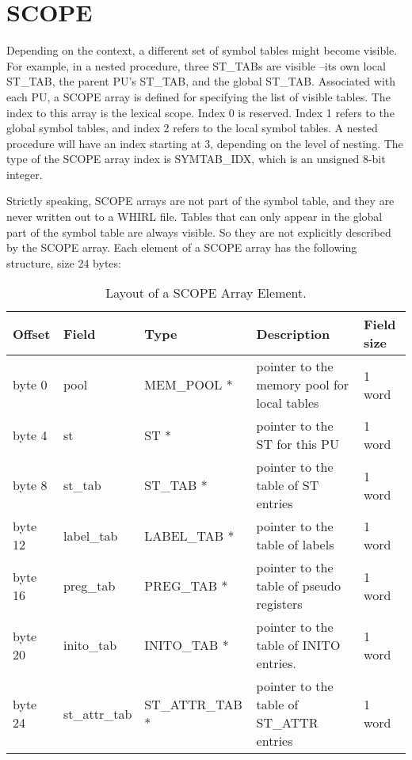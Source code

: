 \section{SCOPE}
Depending on the context, a different set of symbol tables might
become visible. For example, in a nested procedure, three ST\_TABs are
visible --its own local ST\_TAB, the parent PU's ST\_TAB, and the
global ST\_TAB. Associated with each PU, a
%
SCOPE array is defined for
specifying the list of visible tables. The index to this array is the
lexical scope. Index 0 is reserved.  Index 1 refers to the global
symbol tables, and index 2 refers to the local symbol tables. A nested
procedure will have an index starting at 3, depending on the level of
nesting. The type of the
%
SCOPE array index is SYMTAB\_IDX, which is an
unsigned 8-bit integer.

Strictly speaking,
%
SCOPE arrays are not part of the symbol table, and
they are never written out to a WHIRL file. Tables that can only appear
in the global part of the symbol table are always visible. So they are
not explicitly described by the
%
SCOPE array. Each element of a
%
SCOPE
array has the following structure, size 24 bytes:

\begin{table}[h]
\centering
\caption{Layout of a
%
SCOPE Array Element.}
{\small
\begin{tabular}{|l|l|l|l|l|}\hline
Offset & Field & Type & Description & Field size \\\hline\hline
byte 0 & pool &
\index{MEM\_POOL}%
MEM\_POOL * & pointer to the memory pool for local
tables & 1 word \\\hline
byte 4 & st &
\index{ST}%
ST * & pointer to the
\index{ST}%
ST for this
\index{PU}%
PU & 1 word \\\hline
byte 8 & st\_tab &
\index{ST\_TAB}%
ST\_TAB * & pointer to the table of
\index{ST}%
ST entries & 1
word \\\hline
byte 12 & label\_tab &
\index{LABEL\_TAB}%
LABEL\_TAB * & pointer to the table of labels &
1 word \\\hline
byte 16 & preg\_tab &
\index{PREG\_TAB}%
PREG\_TAB * & pointer to the table of pseudo
registers & 1 word \\\hline
byte 20 & inito\_tab &
\index{INITO\_TAB}%
INITO\_TAB * & pointer to the table of
\index{INITO}%
INITO
entries. & 1 word \\\hline
byte 24 & st\_attr\_tab &
\index{ST\_ATTR\_TAB}%
ST\_ATTR\_TAB * & pointer to the table of
\index{ST\_ATTR}%
ST\_ATTR entries &  1 word\\\hline
\end{tabular}
}
\end{table}

